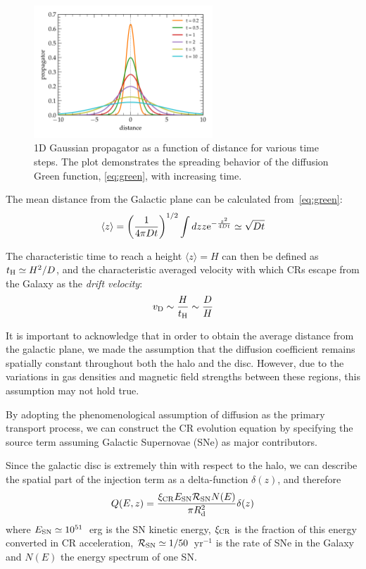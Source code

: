 \begin{figure}[t]
\centering
\includegraphics[width=0.6\textwidth]{figures/gaussian_1D.pdf} 
\caption{1D Gaussian propagator as a function of distance for various time steps. The plot demonstrates the spreading behavior of the diffusion Green function, \cref{eq:green}, with increasing time.}
\label{fig:gaussian1d}
\end{figure}

The mean distance from the Galactic plane can be calculated from~\cref{eq:green}:
%
\begin{equation}
\langle z \rangle = \left(\frac{1}{{4 \pi D t}}\right)^{1/2} \int dz z {\rm e}^{-\frac{z^2}{4Dt}} \simeq \sqrt{Dt}
\end{equation}

The characteristic time to reach a height $\langle z \rangle = H$ can then be defined as  $t_{\rm H} \simeq H^2 / D$, and the characteristic averaged velocity with which CRs escape from the Galaxy as the \emph{drift velocity}:
%
\begin{equation}
v_{\rm D} \sim \frac{H}{t_{\rm H}} \sim \frac{D}{H}
\end{equation}

It is important to acknowledge that in order to obtain the average distance from the galactic plane, we made the assumption that the diffusion coefficient remains spatially constant throughout both the halo and the disc. However, due to the variations in gas densities and magnetic field strengths between these regions, this assumption may not hold true.

By adopting the phenomenological assumption of diffusion as the primary transport process, we can construct the CR evolution equation by specifying the source term assuming Galactic Supernovae (SNe) as major contributors.

Since the galactic disc is extremely thin with respect to the halo, we can describe the spatial part of the injection term as a delta-function $\delta(z)$, and therefore
%
\begin{equation}
Q(E,z) = \frac{\xi_{\rm CR} E_{\rm SN} \mathcal R_{\rm SN} N(E)}{\pi R_{\rm d}^2} \delta(z) 
\end{equation}
%
where $E_{\rm SN} \simeq 10^{51}$~erg is the SN kinetic energy, $\xi_{\rm CR}$ is the fraction of this energy converted in CR acceleration, $\mathcal R_{\rm SN} \simeq 1 / 50$~yr$^{-1}$ is the rate of SNe in the Galaxy and $N(E)$ the energy spectrum of one SN. 

